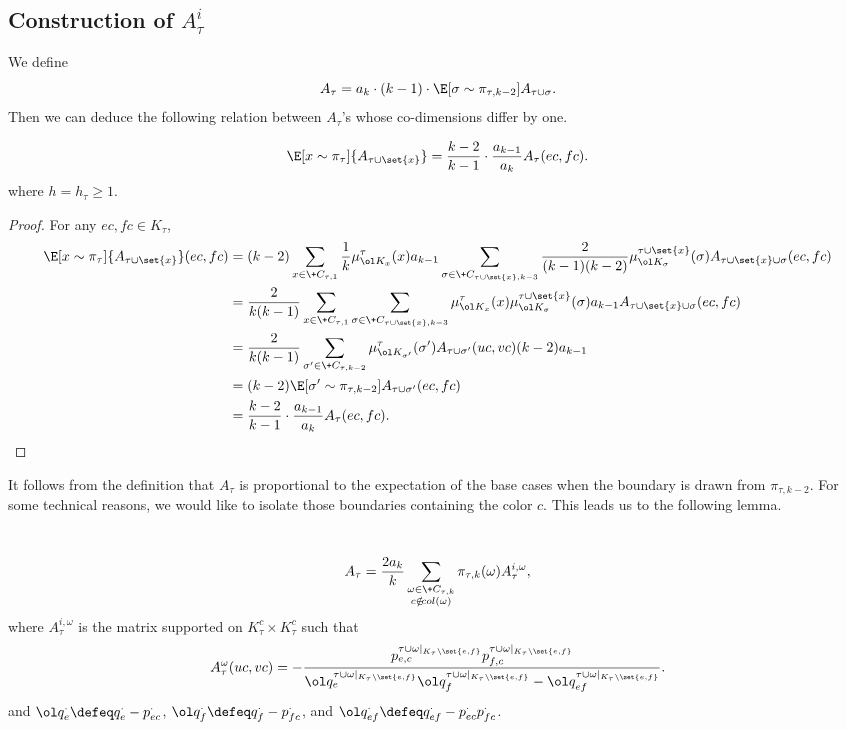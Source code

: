 \subsection{Construction of $A_\tau^i$}\label{sss:Atau}
We define
\begin{equation}\label{eqn:A-def}
	A_\tau = a_{k}\cdot (k-1)\cdot \E[\sigma\sim \pi_{\tau, k-2}]{A_{\tau\cup\sigma}}.
\end{equation}
Then we can deduce the following relation between $A_\tau$'s whose co-dimensions differ by one.
\begin{lemma}
	\[
		\E[x\sim \pi_\tau]{A_{\tau\cup\set{x}}} = \frac{k-2}{k-1}\cdot \frac{a_{k-1}}{a_{k}} A_\tau(ec, fc).
	\]
	where $h = h_\tau \geq 1$.
\end{lemma}
\begin{proof}
For any $ec, fc \in K_\tau$,
	\begin{align*}
		\E[x\sim \pi_\tau]{A_{\tau\cup\set{x}}}(ec, fc)
        &= (k-2)\sum_{x\in \+C_{\tau,1}} \frac{1}{k} \mu_{\ol K_x}^\tau(x) a_{k-1} \sum_{\sigma\in \+C_{\tau\cup\set{x}, k-3}} \frac{2}{(k-1)(k-2)}\mu^{\tau\cup\set{x}}_{\ol K_\sigma}(\sigma) A_{\tau\cup\set{x}\cup\sigma}(ec, fc)\\
		&= \frac{2}{k(k-1)} \sum_{x\in \+C_{\tau,1}}\sum_{\sigma\in \+C_{\tau\cup\set{x}, k-3}}\mu^{\tau}_{\ol K_x}(x) \mu^{\tau\cup\set{x}}_{\ol K_\sigma}(\sigma)a_{k-1}A_{\tau\cup\set{x}\cup\sigma}(ec, fc)\\
		&= \frac{2}{k(k-1)} \sum_{\sigma'\in \+C_{\tau,k-2}} \mu^\tau_{\ol K_{\sigma'}}(\sigma') A_{\tau\cup\sigma'}(uc, vc) (k-2)a_{k-1}\\
        &= (k-2)\E[\sigma'\sim \pi_{\tau, k-2}]{A_{\tau\cup\sigma'}(ec, fc)}\\
		&= \frac{k-2}{k-1}\cdot \frac{a_{k-1}}{a_{k}} A_\tau(ec, fc).
	\end{align*}
\end{proof}

It follows from the definition that $A_\tau$ is proportional to the expectation of the base cases when the boundary is drawn from $\pi_{\tau,k-2}$. For some technical reasons, we would like to isolate those boundaries containing the color $c$. This leads us to the following lemma.

\begin{lemma}~\label{lem:A-tau-i}
    \newcommand{\taur}{\tau\cup\omega|_{K_\tau\setminus\set{e, f}}}
	\[
		A_\tau = \frac{2a_k}{k}\sum_{\substack{\omega\in \+C_{\tau,k}\\ c\notin\!{col}(\omega)}}\pi_{\tau,k}(\omega)A^{i,\omega}_\tau,
	\]
	where $A^{i,\omega}_\tau$ is the matrix supported on $K_\tau^c\times K_\tau^c$ such that
	\[
		A_\tau^{\omega}(uc,vc) = -\frac{p^{\taur}_{e, c}p^{\taur}_{f, c}}{\ol q^{\taur}_{e}\ol q^{\taur}_{f} - \ol q^{\taur}_{ef}}.
	\]
	and $\ol q^{\cdot}_{e}\defeq q^\cdot_{e} - p^\cdot_{ec}$,
    $\ol q^{\cdot}_{f}\defeq q^\cdot_{f} - p^\cdot_{fc}$, and
    $\ol q^{\cdot}_{ef}\defeq q^\cdot_{ef} - p^\cdot_{ec}p^\cdot_{fc}$.
\end{lemma}

